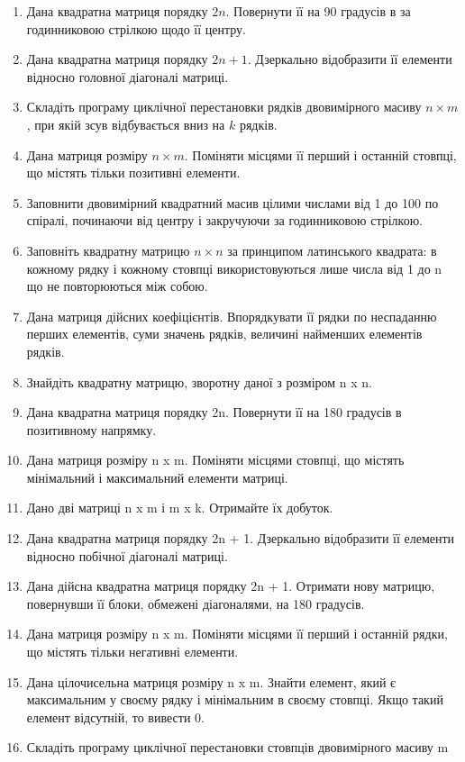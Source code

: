 \documentclass[]{article}
\begin{document}
\begin{enumerate}
\item
  Дана квадратна матриця порядку $2n$. Повернути її на 90 градусів в
  за годинниковою стрілкою щодо її центру.
\item
  Дана квадратна матриця порядку $2n + 1$. Дзеркально відобразити її
  елементи відносно головної діагоналі матриці.
\item
  Складіть програму циклічної перестановки рядків двовимірного масиву $n \times m$,
  при якій зсув відбувається вниз на $k$ рядків.
\item
  Дана матриця розміру $n \times m$. Поміняти місцями її перший і останній
  стовпці, що містять тільки позитивні елементи.
\item
  Заповнити двовимірний квадратний масив цілими числами від 1 до 100 по
  спіралі, починаючи від центру і закручуючи за годинниковою стрілкою.
\item
  Заповніть квадратну матрицю $n \times n$ за принципом латинського квадрата: в
  кожному рядку і кожному стовпці використовуються лише числа від 1 до n
  що не повторюються між собою.
\item
  Дана матриця дійсних коефіцієнтів. Впорядкувати її рядки по неспаданню
  перших елементів, суми значень рядків, величині найменших елементів
  рядків.
\item
Знайдіть квадратну матрицю, зворотну даної з розміром n x n.
\item
Дана квадратна матриця порядку 2n. Повернути її на 180 градусів в
позитивному напрямку.
\item
Дана матриця розміру n x m. Поміняти місцями стовпці, що містять
мінімальний і максимальний елементи матриці.
\item
Дано дві матриці n x m і m x k. Отримайте їх добуток.
\item
Дана квадратна матриця порядку 2n + 1. Дзеркально відобразити її
елементи відносно побічної діагоналі матриці.
\item
Дана дійсна квадратна матриця порядку 2n + 1. Отримати нову матрицю,
повернувши її блоки, обмежені діагоналями, на 180 градусів.
\item
Дана матриця розміру n x m. Поміняти місцями її перший і останній рядки,
що містять тільки негативні елементи.
\item
Дана цілочисельна матриця розміру n x m. Знайти елемент, який є
максимальним у своєму рядку і мінімальним в своєму стовпці. Якщо такий
елемент відсутній, то вивести 0.
\item
Складіть програму циклічної перестановки стовпців двовимірного масиву m

\end{enumerate}
\end{document}
